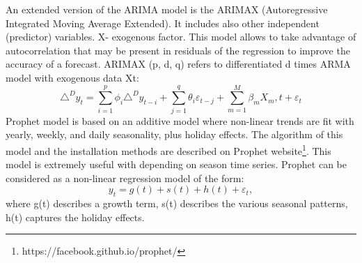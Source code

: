 An extended version of the ARIMA model is the ARIMAX (Autoregressive Integrated Moving Average Extended). It includes also other independent (predictor) variables. X- exogenous factor. This model allows to take advantage of autocorrelation that may be present in residuals of the regression to improve the accuracy of a forecast. ARIMAX (p, d, q) refers to differentiated d times ARMA model with exogenous data Xt:
\begin{equation}\label{eq:ARIMAX}
\triangle^{D} y_{t} =  \sum_{i=1}^{p}\phi_i \triangle^{D} y_{t-i} + \sum_{j=1}^{q}\theta_i \varepsilon_{t-j} + \sum_{m=1}^{M}\beta_m X_m, t + \varepsilon_t 
\end{equation}
Prophet model is based on an additive model where non-linear trends are fit with yearly, weekly, and daily seasonality, plus holiday effects. The algorithm of this model and the installation methods are described on Prophet website\footnote{https://facebook.github.io/prophet/}. This model is extremely useful with depending on season time series. Prophet can be considered as a non-linear regression model of the form:
\begin{equation}\label{eq:ARIMAX}
y_{t}= g(t)+s(t)+h(t)+\varepsilon_{t} ,
\end{equation}
where g(t) describes a growth term, s(t) describes the various seasonal patterns, h(t) captures the holiday effects.
